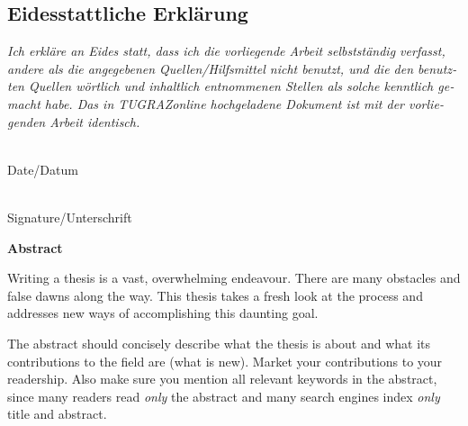 \vspace{1cm}


\begin{otherlanguage}{austrian}

\subsection*{Eidesstattliche Erklärung}
\noindent
\textit{
Ich erkläre an Eides statt, dass ich die vorliegende Arbeit
selbstständig verfasst, andere als die angegebenen Quellen/Hilfsmittel
nicht benutzt, und die den benutzten Quellen wörtlich und inhaltlich
entnommenen Stellen als solche kenntlich gemacht habe. Das in
TUGRAZonline hochgeladene Dokument ist mit der vorliegenden
Arbeit identisch.}

\vspace{2cm}

\noindent
\parbox[top]{4cm}{
\begin{center}
\underline{\hspace*{4cm}} \\
Date/Datum
\end{center}
}
%
\hfill
%
\parbox[top]{6cm}{
\begin{center}
\underline{\hspace*{6cm}} \\
Signature/Unterschrift
\end{center}
} 

\end{otherlanguage}






\cleardoublepage

\vspace*{2cm}

\begin{center}
{\Large\sffamily\bfseries Abstract}
\end{center}

Writing a thesis is a vast, overwhelming endeavour. There are many
obstacles and false dawns along the way. This thesis takes a fresh
look at the process and addresses new ways of accomplishing this
daunting goal.

The abstract should concisely describe what the thesis is about and
what its contributions to the field are (what is new). Market your
contributions to your readership. Also make sure you mention all
relevant keywords in the abstract, since many readers read \emph{only}
the abstract and many search engines index \emph{only} title and
abstract.

